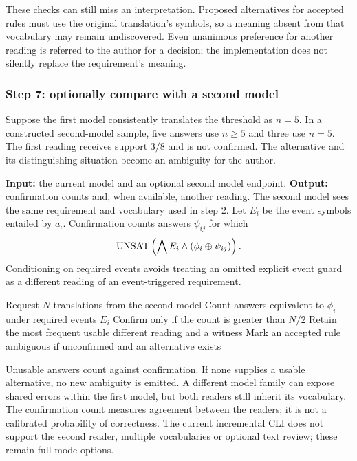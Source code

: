 These checks can still miss an interpretation. Proposed alternatives for
accepted rules must use the original translation's symbols, so a meaning
absent from that vocabulary may remain undiscovered. Even unanimous
preference for another reading is referred to the author for a decision;
the implementation does not silently replace the requirement's meaning.

\subsubsection{Step 7: optionally compare with a second model}
Suppose the first model consistently translates the threshold as $n=5$.
In a constructed second-model sample, five answers use $n\ge5$ and three
use $n=5$. The first reading receives support $3/8$ and is not confirmed.
The alternative and its distinguishing situation become an ambiguity for
the author.

\textbf{Input:} the current model and an optional second model endpoint.
\textbf{Output:} confirmation counts and, when available, another reading.
The second model sees the same requirement and vocabulary used in step 2.
Let $E_i$ be the event symbols entailed by $a_i$. Confirmation counts
answers $\psi_{ij}$ for which
\[
 \operatorname{UNSAT}\left(\bigwedge E_i\land(\phi_i\mathbin{\oplus}\psi_{ij})\right).
\]
Conditioning on required events avoids treating an omitted explicit event
guard as a different reading of an event-triggered requirement.

\begin{algorithm}[H]
\caption{Compare a second reader with the selected translation}\label{alg:second-reader}
\begin{algorithmic}[1]
  \State Request $N$ translations from the second model
  \State Count answers equivalent to $\phi_i$ under required events $E_i$
  \State Confirm only if the count is greater than $N/2$
  \State Retain the most frequent usable different reading and a witness
  \State Mark an accepted rule ambiguous if unconfirmed and an alternative exists
\EndFor
\end{algorithmic}
\end{algorithm}

Unusable answers count against confirmation. If none supplies a usable
alternative, no new ambiguity is emitted. A different model family can
expose shared errors within the first model, but both readers still inherit
its vocabulary. The confirmation count measures agreement between the
readers; it is not a calibrated probability of correctness.
The current incremental CLI does not support the second reader, multiple
vocabularies or optional text review; these remain full-mode options.

